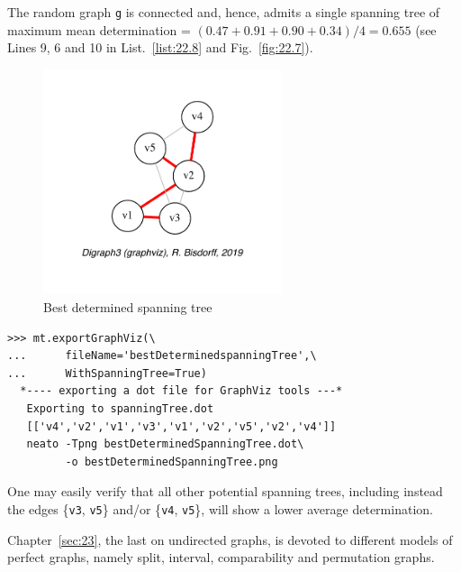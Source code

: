 The random graph \texttt{g} is connected and, hence, admits a single spanning tree of maximum mean determination = $(0.47 + 0.91 + 0.90 + 0.34)/4 = 0.655$ (see Lines 9, 6 and 10 in List.~\vref{list:22.8} and Fig.~\vref{fig:22.7}).
\begin{figure}[ht]
\sidecaption[t]
\includegraphics[width=7cm]{Figures/22-7-bestDeterminedSpanningTree.pdf}
\caption{Best determined spanning tree} 
\label{fig:22.7}       %
\end{figure}
\begin{lstlisting}
>>> mt.exportGraphViz(\
...      fileName='bestDeterminedspanningTree',\
...      WithSpanningTree=True)
  *---- exporting a dot file for GraphViz tools ---*
   Exporting to spanningTree.dot
   [['v4','v2','v1','v3','v1','v2','v5','v2','v4']]
   neato -Tpng bestDeterminedSpanningTree.dot\
         -o bestDeterminedSpanningTree.png
\end{lstlisting}

One may easily verify that all other potential spanning trees, including instead the edges \{\texttt{v3}, \texttt{v5}\} and/or \{\texttt{v4}, \texttt{v5}\}, will show a lower average determination.

\vspace{\baselineskip}

Chapter~\ref{sec:23}, the last on undirected graphs, is devoted to different models of perfect graphs, namely split, interval, comparability and permutation graphs. 
 
%


